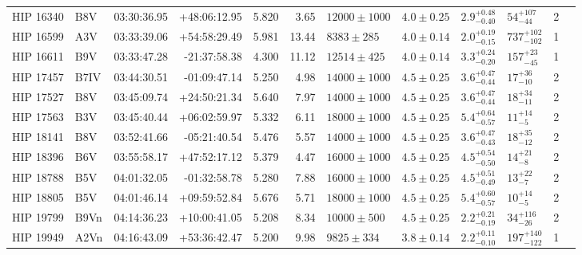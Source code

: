 \begin{tiny}
\begin{longtable}{|l|lrrrrllllll|}
   HIP 16340 &      B8V &    03:30:36.95 &   +48:06:12.95 &   5.820 &      3.65 &  $12000 \pm 1000$ &  $4.0 \pm 0.25$ &  $2.9^{+0.48}_{-0.40}$ &     $54^{+107}_{-44}$ &       2 \\
   HIP 16599 &      A3V &    03:33:39.06 &   +54:58:29.49 &   5.981 &     13.44 &    $8383 \pm 285$ &  $4.0 \pm 0.14$ &  $2.0^{+0.19}_{-0.15}$ &   $737^{+102}_{-102}$ &       1 \\
   HIP 16611 &      B9V &    03:33:47.28 &   -21:37:58.38 &   4.300 &     11.12 &   $12514 \pm 425$ &  $4.0 \pm 0.14$ &  $3.3^{+0.24}_{-0.20}$ &     $157^{+23}_{-45}$ &       1 \\
   HIP 17457 &     B7IV &    03:44:30.51 &   -01:09:47.14 &   5.250 &      4.98 &  $14000 \pm 1000$ &  $4.5 \pm 0.25$ &  $3.6^{+0.47}_{-0.44}$ &      $17^{+36}_{-10}$ &       2 \\
   HIP 17527 &      B8V &    03:45:09.74 &   +24:50:21.34 &   5.640 &      7.97 &  $14000 \pm 1000$ &  $4.5 \pm 0.25$ &  $3.6^{+0.47}_{-0.44}$ &      $18^{+34}_{-11}$ &       2 \\
   HIP 17563 &      B3V &    03:45:40.44 &   +06:02:59.97 &   5.332 &      6.11 &  $18000 \pm 1000$ &  $4.5 \pm 0.25$ &  $5.4^{+0.64}_{-0.57}$ &       $11^{+14}_{-5}$ &       2 \\
   HIP 18141 &      B8V &    03:52:41.66 &   -05:21:40.54 &   5.476 &      5.57 &  $14000 \pm 1000$ &  $4.5 \pm 0.25$ &  $3.6^{+0.47}_{-0.43}$ &      $18^{+35}_{-12}$ &       2 \\
   HIP 18396 &      B6V &    03:55:58.17 &   +47:52:17.12 &   5.379 &      4.47 &  $16000 \pm 1000$ &  $4.5 \pm 0.25$ &  $4.5^{+0.54}_{-0.50}$ &       $14^{+21}_{-8}$ &       2 \\
   HIP 18788 &      B5V &    04:01:32.05 &   -01:32:58.78 &   5.280 &      7.88 &  $16000 \pm 1000$ &  $4.5 \pm 0.25$ &  $4.5^{+0.51}_{-0.49}$ &       $13^{+22}_{-7}$ &       2 \\
   HIP 18805 &      B5V &    04:01:46.14 &   +09:59:52.84 &   5.676 &      5.71 &  $18000 \pm 1000$ &  $4.5 \pm 0.25$ &  $5.4^{+0.60}_{-0.57}$ &       $10^{+14}_{-5}$ &       2 \\
   HIP 19799 &     B9Vn &    04:14:36.23 &   +10:00:41.05 &   5.208 &      8.34 &   $10000 \pm 500$ &  $4.5 \pm 0.25$ &  $2.2^{+0.21}_{-0.19}$ &     $34^{+116}_{-26}$ &       2 \\
   HIP 19949 &     A2Vn &    04:16:43.09 &   +53:36:42.47 &   5.200 &      9.98 &    $9825 \pm 334$ &  $3.8 \pm 0.14$ &  $2.2^{+0.11}_{-0.10}$ &   $197^{+140}_{-122}$ &       1 \\

\end{longtable}
\end{tiny}

